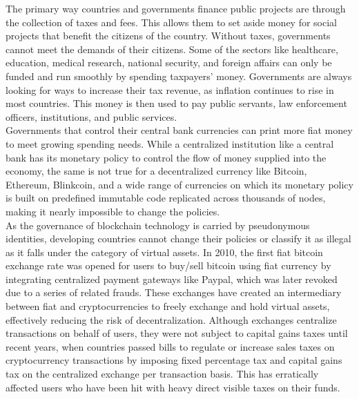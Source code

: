 \documentclass[letterpaper,11pt]{article}
\begin{document}
The primary way countries and governments finance public projects are through the collection of taxes and fees. This allows them to set aside money for social projects that benefit the citizens of the country. Without taxes, governments cannot meet the demands of their citizens. Some of the sectors like healthcare, education, medical research, national security, and foreign affairs can only be funded and run smoothly by spending taxpayers' money. Governments are always looking for ways to increase their tax revenue, as inflation continues to rise in most countries. This money is then used to pay public servants, law enforcement officers, institutions, and public services.\\

Governments that control their central bank currencies can print more fiat money to meet growing spending needs. While a centralized institution like a central bank has its monetary policy to control the flow of money supplied into the economy,  the same is not true for a decentralized currency like Bitcoin, Ethereum, Blinkcoin, and a wide range of currencies on which its monetary policy is built on predefined immutable code replicated across thousands of nodes, making it nearly impossible to change the policies.\\

As the governance of blockchain technology is carried by pseudonymous identities, developing countries cannot change their policies or classify it as illegal as it falls under the category of virtual assets. In 2010, the first fiat bitcoin exchange rate was opened for users to buy/sell bitcoin using fiat currency by integrating centralized payment gateways like Paypal, which was later revoked due to a series of related frauds. These exchanges have created an intermediary between fiat and cryptocurrencies to freely exchange and hold virtual assets, effectively reducing the risk of decentralization. Although exchanges centralize transactions on behalf of users, they were not subject to capital gains taxes until recent years, when countries passed bills to regulate or increase sales taxes on cryptocurrency transactions by imposing fixed percentage tax and capital gains tax on the centralized exchange per transaction basis. This has erratically affected users who have been hit with heavy direct visible taxes on their funds.\\
\end{document}
